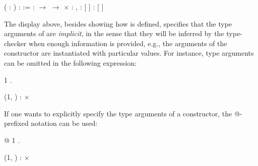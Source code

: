 \coqdoceol
\coqdocemptyline
\coqdocnoindent
{}  (  : ) :  :=   :  \ensuremath{\rightarrow}  \ensuremath{\rightarrow}  \ensuremath{\times} \coqdoceol
\coqdocnoindent
\coqdoceol
\coqdocnoindent
{} :  ,      \coqdoceol
\coqdocnoindent
{} :    [ ]\coqdoceol
\coqdocnoindent
{} :    [  \coqdocvar{\_} \coqdocvar{\_}]

\coqdocemptyline


The display above, besides showing how  is defined, specifies
that the type arguments of  are \textit{implicit}, in the sense that
they will be inferred by the type-checker when enough information is
provided, e.g., the arguments of the constructor  are
instantiated with particular values. For instance, type arguments can
be omitted in the following expression: \begin{coqdoccode}
\coqdocemptyline
\coqdocnoindent
{}  1 .\coqdoceol
\coqdocemptyline
\end{coqdoccode}


\coqdoceol
\coqdocemptyline
\coqdocnoindent
(1, ) :  \ensuremath{\times} 

\coqdocemptyline


If one wants to explicitly specify the type arguments of a
constructor, the @-prefixed notation can be used:


\begin{coqdoccode}
\coqdocemptyline
\coqdocnoindent
{} @   1 .\coqdoceol
\coqdocemptyline
\end{coqdoccode}
\coqdoceol
\coqdocemptyline
\coqdocnoindent
\coqdoceol
\coqdocnoindent
(1, ) :  \ensuremath{\times} 

